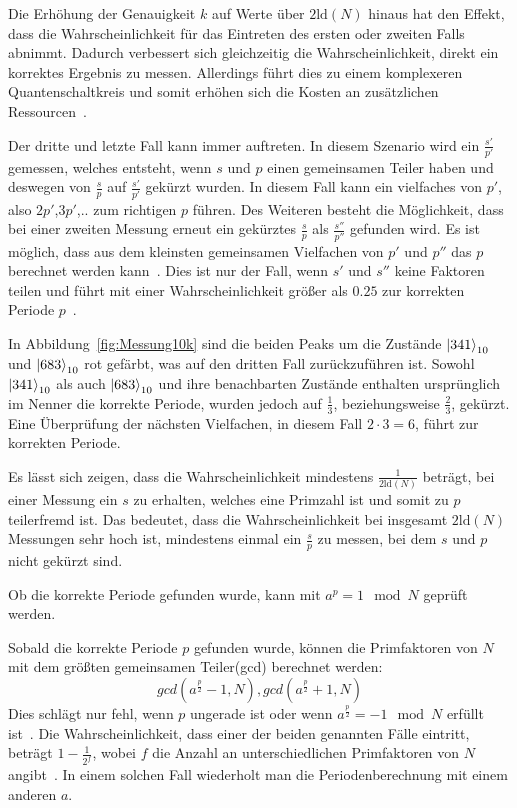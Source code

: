Die Erhöhung der Genauigkeit \(k\) auf Werte über \(2\text{ld}(N)\) hinaus hat den Effekt, 
dass die Wahrscheinlichkeit für das Eintreten des ersten oder zweiten Falls abnimmt.
Dadurch verbessert sich gleichzeitig die Wahrscheinlichkeit, direkt ein korrektes Ergebnis zu messen.
Allerdings führt dies zu einem komplexeren Quantenschaltkreis und 
somit erhöhen sich die Kosten an zusätzlichen Ressourcen~\autocite[229]{nielsen_chuang_2010}.

Der dritte und letzte Fall kann immer auftreten.
In diesem Szenario wird ein \(\frac{s'}{p'}\) gemessen, 
welches entsteht, wenn \(s\) und \(p\) einen gemeinsamen Teiler haben und 
deswegen von \(\frac{s}{p}\) auf \(\frac{s'}{p'}\) gekürzt wurden.
In diesem Fall kann ein vielfaches von \(p'\), also \(2p'\),\(3p'\),.. zum richtigen \(p\) führen.
Des Weiteren besteht die Möglichkeit, 
dass bei einer zweiten Messung erneut ein gekürztes \(\frac{s}{p}\) als \(\frac{s''}{p''}\) gefunden wird.
Es ist möglich, dass aus dem kleinsten gemeinsamen Vielfachen von \(p'\) und \(p''\) das \(p\) berechnet werden kann~\cite{Shor_1997}.
Dies ist nur der Fall, wenn \(s'\) und \(s''\) keine Faktoren teilen und 
führt mit einer Wahrscheinlichkeit größer als \(0.25\) zur korrekten Periode \(p\)~\autocite[231]{nielsen_chuang_2010}.

In Abbildung~\ref{fig:Messung10k} sind die beiden Peaks um die Zustände \(\ket{341}_{10}\) und \(\ket{683}_{10}\) rot gefärbt, 
was auf den dritten Fall zurückzuführen ist.
Sowohl \(\ket{341}_{10}\) als auch \(\ket{683}_{10}\) und ihre benachbarten Zustände 
enthalten ursprünglich im Nenner die korrekte Periode, 
wurden jedoch  auf \(\frac{1}{3}\), beziehungsweise \(\frac{2}{3}\), gekürzt. 
Eine Überprüfung der nächsten Vielfachen, in diesem Fall \(2 \cdot 3 = 6 \), führt zur korrekten Periode.

Es lässt sich zeigen, dass die Wahrscheinlichkeit mindestens \(\frac{1}{2\text{ld}(N)}\) beträgt, 
bei einer Messung ein \(s\) zu erhalten, welches eine Primzahl ist und somit zu \(p\) teilerfremd ist.
Das bedeutet, dass die Wahrscheinlichkeit bei insgesamt \(2\text{ld}(N)\) Messungen sehr hoch ist, 
mindestens einmal ein \(\frac{s}{p}\) zu messen, 
bei dem \(s\) und \(p\) nicht gekürzt sind.~\cite[231]{nielsen_chuang_2010}

Ob die korrekte Periode gefunden wurde, kann mit \(a^p = 1 \mod N\) geprüft werden.

Sobald die korrekte Periode \(p\) gefunden wurde, 
können die Primfaktoren von \(N\) mit dem größten gemeinsamen Teiler(gcd) berechnet werden:
\[gcd(a^{\frac{p}{2}}-1, N), gcd(a^{\frac{p}{2}}+1, N)\]
Dies schlägt nur fehl, 
wenn \(p\) ungerade ist
oder wenn \(a^{\frac{p}{2}} = -1 \mod N\) erfüllt ist~\cite{Shor_1997}.
Die Wahrscheinlichkeit, dass einer der beiden genannten Fälle eintritt, beträgt \(1-\frac{1}{2^f}\), 
wobei \(f\) die Anzahl an unterschiedlichen Primfaktoren von \(N\) angibt~\cite{Shor_1997}.
In einem solchen Fall wiederholt man die Periodenberechnung mit einem anderen \(a\).

